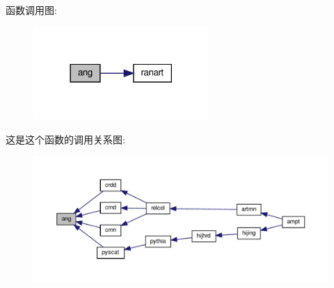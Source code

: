 函数调用图\+:
\nopagebreak
\begin{figure}[H]
\begin{center}
\leavevmode
\includegraphics[width=189pt]{ang_8f90_acea5ff8ca44ed9803ba45568dc380dd2_cgraph}
\end{center}
\end{figure}
这是这个函数的调用关系图\+:
\nopagebreak
\begin{figure}[H]
\begin{center}
\leavevmode
\includegraphics[width=350pt]{ang_8f90_acea5ff8ca44ed9803ba45568dc380dd2_icgraph}
\end{center}
\end{figure}
